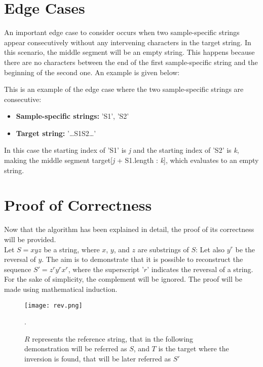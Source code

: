 \section{Edge Cases}
An important edge case to consider occurs when two sample-specific strings appear consecutively without any intervening characters in the target string. In this scenario, the middle segment will be an empty string. This happens because there are no characters between the end of the first sample-specific string and the beginning of the second one. An example is given below:

\begin{example}
  This is an example of the edge case where the two sample-specific strings are consecutive:
\begin{itemize}
    \item \textbf{Sample-specific strings: } 'S1', 'S2'
    \item \textbf{Target string: }  '\dots S1S2\dots'
\end{itemize}
\end{example}


In this case the starting index of 'S1' is \textit{j} and the starting index of 'S2' is \textit{k}, making the middle segment target[\textit{j} + S1.length : \textit{k}], which evaluates to an empty string.

\section{Proof of Correctness}

Now that the algorithm has been explained in detail, the proof of its correctness will be provided. \\
Let \( S = xyz \) be a string, where \( x \), \( y \), and \( z \) are substrings of \( S \): Let also \(y^r \) be the reversal of \( y \). The aim is to demonstrate that it is possible to reconstruct the sequence \( S' = z^r y^r x^r \), where the superscript '\( r \)' indicates the reversal of a string. For the sake of simplicity, the complement will be ignored. The proof will be made using mathematical induction. 

\begin{figure}[h]

  \centering
    \texttt{[image: rev.png]}

  \caption{\( R \) represents the reference string, that in the following demonstration will be referred as \( S \), and \( T \) is the target where the inversion is found, that will be later referred as \( S' \)}.
  \label{fig:rev}

\end{figure}

